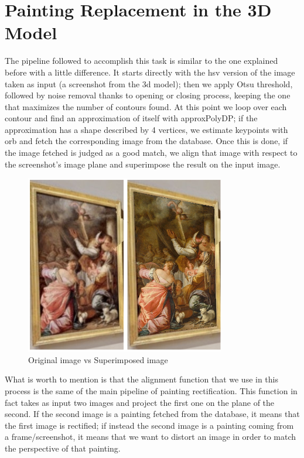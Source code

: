 \documentclass[conference]{IEEEtran}
\begin{document}
\section{Painting Replacement in the 3D Model}
The pipeline followed to accomplish this task is similar to the one explained before with a little difference. It starts directly with the hsv version of the image taken as input (a screenshot from the 3d model); then we apply Otsu threshold, followed by noise removal thanks to opening or closing process, keeping the one that maximizes the number of contours found. At this point we loop over each contour and find an approximation of itself with approxPolyDP; if the approximation has a shape described by 4 vertices, we estimate keypoints with orb and fetch the corresponding image from the database. Once this is done, if the image fetched is judged as a good match, we align that image with respect to the screenshot’s image plane and superimpose the result on the input image.

\begin{figure}[htbp]
\centerline{\includegraphics[width=0.8\columnwidth]{../3DModel/collage_06.jpg}}
\caption{Original image vs Superimposed image}
\label{fig_3d_model}
\end{figure}

What is worth to mention is that the alignment function that we use in this process is the same of the main pipeline of painting rectification. This function in fact takes as input two images and project the first one on the plane of the second. If the second image is a painting fetched from the database, it means that the first image is rectified; if instead the second image is a painting coming from a frame/screenshot, it means that we want to distort an image in order to match the perspective of that painting.\\
\end{document}
